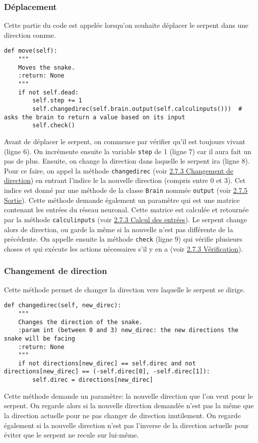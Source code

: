 \documentclass[12pt, a4paper, openany]{book}
\begin{document}
\subsubsection{Déplacement}
\label{r:2.7.3-dep}
Cette partie du code est appelée lorsqu'on souhaite déplacer le serpent dans une direction connue.
\begin{verbatim}
def move(self):
    """
    Moves the snake.
    :return: None
    """
    if not self.dead:
        self.step += 1
        self.changedirec(self.brain.output(self.calculinputs()))  # asks the brain to return a value based on its input
        self.check()
\end{verbatim}
Avant de déplacer le serpent, on commence par vérifier qu'il est toujours vivant (ligne 6). On incrémente ensuite la variable \verb'step' de 1 (ligne 7) car il aura fait un \og{}pas\fg{} de plus. Ensuite, on change la direction dans laquelle le serpent ira (ligne 8). Pour ce faire, on appel la méthode \verb'changedirec' (voir \hyperref[r:2.7.3-dir]{2.7.3 Changement de direction}) en entrant l'indice le la nouvelle direction (compris entre 0 et 3). Cet indice est donné par une méthode de la classe \verb'Brain' nommée \verb'output' (voir \hyperref[r:2.7.5-sor]{2.7.5 Sortie}). Cette méthode demande également un paramètre qui est une matrice contenant les entrées du réseau neuronal. Cette matrice est calculée et retournée par la méthode \verb'calculinputs' (voir \hyperref[r:2.7.3-ent]{2.7.3 Calcul des entrées}). Le serpent change alors de direction, ou garde la même si la nouvelle n'est pas différente de la précédente. On appelle ensuite la méthode \verb'check' (ligne 9) qui vérifie plusieurs choses et qui exécute les actions nécessaires s'il y en a (voir \hyperref[r:2.7.3-ver]{2.7.3 Vérification}).

\subsubsection{Changement de direction}
\label{r:2.7.3-dir}
Cette méthode permet de changer la direction vers laquelle le serpent se dirige.
\begin{verbatim}
def changedirec(self, new_direc):
    """
    Changes the direction of the snake.
    :param int (between 0 and 3) new_direc: the new directions the snake will be facing
    :return: None
    """
    if not directions[new_direc] == self.direc and not directions[new_direc] == (-self.direc[0], -self.direc[1]):
        self.direc = directions[new_direc]
\end{verbatim}
Cette méthode demande un paramètre: la nouvelle direction que l'on veut pour le serpent. On regarde alors si la nouvelle direction demandée n'est pas la même que la direction actuelle pour ne pas changer de direction inutilement. On regarde également si la nouvelle direction n'est pas l'inverse de la direction actuelle pour éviter que le serpent ne recule sur lui-même.
\end{document}
